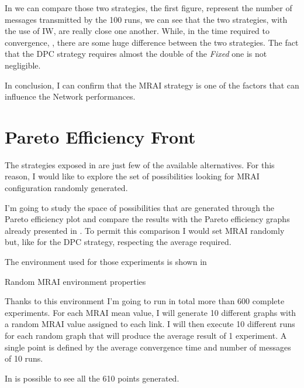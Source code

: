 In  we can compare those two strategies,
the first figure,  represent
the number of messages transmitted by the \num{100} runs, we can see that
the two strategies, with the use of \ac{IW}, are really close one another.
While, in the time required to convergence, ,
there are some huge difference between the two strategies.
The fact that the \ac{DPC} strategy requires almost the double of the
\textit{Fixed} one is not negligible.

In conclusion, I can confirm that the \ac{MRAI} strategy is one of the factors that
can influence the Network performances.

\section{Pareto Efficiency Front}
\label{sec:bgp_mrai_pareto_front}

The strategies exposed in  are just few
of the available alternatives.
For this reason, I would like to explore the set of possibilities looking
for \ac{MRAI} configuration randomly generated.

I'm going to study the space of possibilities that are generated through the
Pareto efficiency plot and compare the results with the Pareto efficiency
graphs already presented in .
To permit this comparison I would set \ac{MRAI} randomly but, like for
the \ac{DPC} strategy, respecting the average required.

The environment used for those experiments is shown in 

\begin{table}[h]
	
	\caption{Random \ac{MRAI} environment properties}
	\label{tbl:random_env}
\end{table}

Thanks to this environment I'm going to run in total more than \num{600} complete
experiments.
For each \ac{MRAI} mean value, I will generate \num{10} different graphs with a random
\ac{MRAI} value assigned to each link.
I will then execute \num{10} different runs for each random graph that will produce
the average result of \num{1} experiment.
A single point is defined by the average convergence time and number of messages
of \num{10} runs.

In  is possible to see all the \num{610} points
generated.

